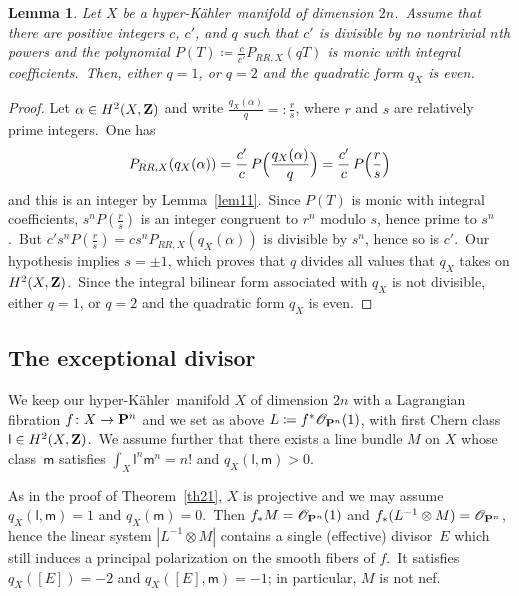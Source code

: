 \documentclass[12pt]{amsart}
\def\cO{\mathscr{O}}
\def\Z{{\bf Z}}
\def\P{{\bf P}}
\def\hk{hyper-K\"ahler}
\newtheorem{lemm}{Lemma}[section]
\theoremstyle{remark}
\def\lll{\ensuremath{\mathsf l}}
\def\mm{\ensuremath{\mathsf m}}
\begin{document}
\begin{lemm}\label{star}
Let $X$ be a \hk\ manifold of dimension $2n$.\ Assume that there are positive integers $c$, $c'$, and $q$  such that $c'$ is divisible by no nontrivial $n$th powers and the polynomial $P(T)\coloneqq \frac{c}{c'}P_{RR,X}(qT)$ is  monic  with integral coefficients.\ Then, either $q=1$, or $q=2$  and the quadratic form $q_X$ is even.
\end{lemm}

\begin{proof}
Let $\alpha\in H^2(X,\Z)$ and write $\frac{ q_X(\alpha)}{q}=:\frac{r}{s}$, where $r$ and $s$ are relatively prime integers.\ One has
\begin{equation*}
    P_{RR,X}( q_X(\alpha))=\frac{c'}c\, P\Bigl(\frac{q_X(\alpha)}{q}\Bigr)
    =\frac{c'}c\, P\Bigl(\frac{r}{s}\Bigr)
\end{equation*}
and this is an integer by Lemma~\ref{lem11}.\ Since $P(T)$ is monic  with integral coefficients, $s^nP(\frac{r}{s})$ is an integer congruent to $r^n$ modulo $s$, hence prime to $s^n$.\ But $c's^nP(\frac{r}{s})= cs^nP_{RR,X}( q_X(\alpha))$ is divisible by $s^n$, hence so is $c'$.\ Our hypothesis implies $s=\pm1$, which proves that  $q$ divides all values that $q_X$ takes on $H^2(X,\Z)$.\
Since the  integral bilinear form associated with $q_X$ is  not  divisible, either $q=1$, or $q=2$  and the quadratic form $q_X$ is even.
\end{proof}


\subsection{The exceptional divisor}\label{subsec:ExceptionalDivisor}

We keep our \hk\ manifold $X$ of dimension $2n$ with a Lagrangian fibration $f\colon X\to \P^n$ and we set as above $L\coloneqq f^*\cO_{\P^n}(1)$, with first Chern class $\lll\in H^2(X,\Z)$.\
We assume further that there exists a line bundle $M$ on $X$ whose class~$\mm$ satisfies $\int_X \lll^{n}\mm^{n}=n!$ and $q_X(\lll,\mm)>0$.\

As in the proof of Theorem~\ref{th21}, $X$ is projective and we may assume  $q_X(\lll,\mm)=1$ and $q_X(\mm)=0$.\
Then $f_*M=\cO_{\P^n}(1)$ and $f_*(L^{-1}\otimes M )=\cO_{\P^n}$, hence the linear system  $| L^{-1}\otimes M |$ contains a single (effective) divisor~$E$  which still induces a principal polarization on the smooth fibers of $f$.\
It satisfies $q_X([E])=-2$ and $q_X([E],\mm)=-1$; in particular, $M$ is not nef.
\end{document}
